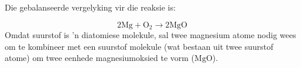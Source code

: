         \label{m38684*id138529}Die gebalanseerde vergelyking vir die reaksie is:\par 
        \label{m38684*id138535}\nopagebreak\noindent{}
    \begin{equation*}
    2\text{Mg}+{\text{O}}_{2}\to 2\text{MgO}
      \end{equation*}
Omdat suurstof is  'n diatomiese molekule, sal twee magnesium atome nodig wees om te kombineer met een suurstof molekule (wat bestaan uit twee suurstof atome) om twee eenhede magnesiumoksied te vorm ($\text{MgO}$).\\
% 
% 
% 			
% 		
% 		
% 	

